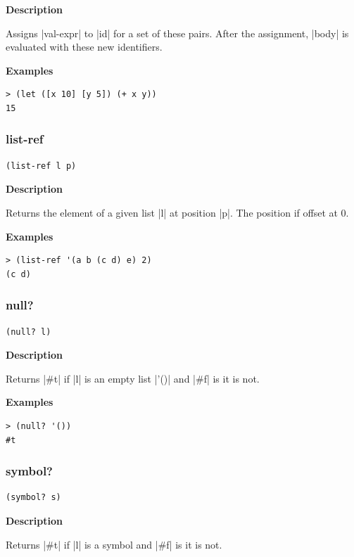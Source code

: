 \documentclass[a4paper]{article}
\begin{document}
\textbf{Description}

Assigns |val-expr| to |id| for a set of these pairs. After the assignment, |body| is evaluated with these new identifiers.

\textbf{Examples}

\begin{lstlisting}
> (let ([x 10] [y 5]) (+ x y))
15
\end{lstlisting}

\subsubsection{list-ref}

\begin{lstlisting}[frame=none]
(list-ref l p)
\end{lstlisting}

\textbf{Description}

Returns the element of a given list |l| at position |p|. The position if offset at 0.

\textbf{Examples}

\begin{lstlisting}
> (list-ref '(a b (c d) e) 2)
(c d)
\end{lstlisting}

\subsubsection{null?}

\begin{lstlisting}[frame=none]
(null? l)
\end{lstlisting}

\textbf{Description}

Returns |#t| if |l| is an empty list |'()| and |#f| is it is not.

\textbf{Examples}

\begin{lstlisting}
> (null? '())
#t
\end{lstlisting}

\subsubsection{symbol?}

\begin{lstlisting}[frame=none]
(symbol? s)
\end{lstlisting}

\textbf{Description}

Returns |#t| if |l| is a symbol and |#f| is it is not.
\end{document}
